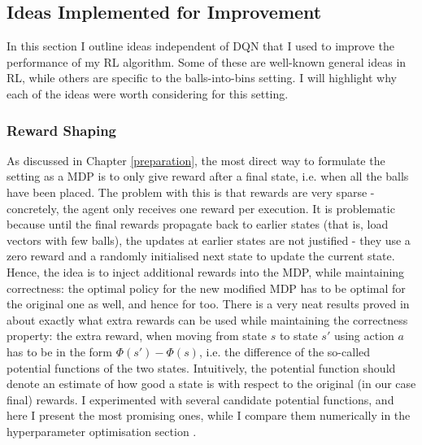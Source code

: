 \subsection{Ideas Implemented for Improvement} \label{improvementideas}


In this section I outline ideas independent of DQN that I used to improve the performance of my RL algorithm. Some of these are well-known general ideas in RL, while others are specific to the \TwoThinning balls-into-bins setting. I will highlight why each of the ideas were worth considering for this setting.


\subsubsection{Reward Shaping} \label{rewardshaping}

As discussed in Chapter \ref{preparation}, the most direct way to formulate the \TwoThinning setting as a MDP is to only give reward after a final state, i.e. when all the balls have been placed. The problem with this is that rewards are very sparse - concretely, the agent only receives one reward per execution. It is problematic because until the final rewards propagate back to earlier states (that is, load vectors with few balls), the updates at earlier states are not justified - they use a zero reward and a randomly initialised next state to update the current state. Hence, the idea is to inject additional rewards into the MDP, while maintaining correctness: the optimal policy for the new modified MDP has to be optimal for the original one as well, and hence for \TwoThinning too. There is a very neat results proved in \cite{ng1999rewardshaping} about exactly what extra rewards can be used while maintaining the correctness property: the extra reward, when moving from state $s$ to state $s'$ using action $a$ has to be in the form $\Phi(s')-\Phi(s)$, i.e. the difference of the so-called potential functions of the two states. Intuitively, the potential function should denote an estimate of how good a state is with respect to the original (in our case final) rewards. I experimented with several candidate potential functions, and here I present the most promising ones, while I compare them numerically in the hyperparameter optimisation section .

